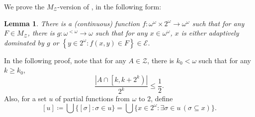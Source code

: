 \documentclass[a4paper,12pt]{amsart}
\newtheorem{lem}[thm]{Lemma}
\theoremstyle{definition}
\numberwithin{thm}{section}
\numberwithin{equation}{section}
\newcommand{\oo}{{\omega}^\omega}
\newcommand{\fsq}{\omega^{<\omega}}
\newcommand{\set}[2]
{\left\{{#1}:{#2}\right\}}  %
\newcommand{\Z}{\mathcal{Z}}
\begin{document}
    We prove the $M_\Z$-version of , in the following form:
    
    \begin{lem}\label{lem:MZ_max}
		There is a (continuous) function $f\colon \oo\times2^\omega\to\oo$ such that for any $F\in M_\Z$, there is $g\colon\fsq\to\omega$ such that for any $x\in\oo$, $x$ is either adaptively dominated by $g$ or  $\set{y\in2^\omega}{f(x,y)\in F}\in\mathcal{E}$. 
	\end{lem}

    In the following proof, note that for any $A\in\Z$, there is $k_0<\omega$ such that for any $k\geq k_0$,
    \[
    \frac{|A\cap \left[k,k+2^k\right)|}{2^k}\leq\frac{1}{2}.
    \]
    Also, for a set $u$ of partial functions from $\omega$ to $2$, define
    \[
    [u]\coloneq\bigcup\{[\sigma]:\sigma\in u\}=\bigcup\{x\in2^\omega:\exists\sigma\in u\,(\sigma\subseteq x)\}.
    \]
    
\end{document}
